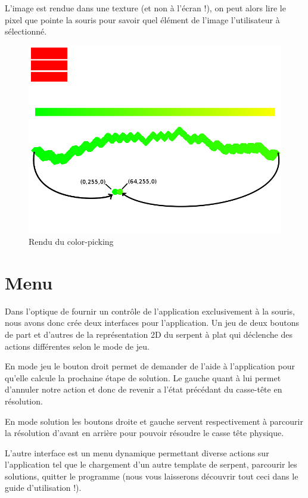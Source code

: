 L'image est rendue dans une texture (et non à l'écran !), on peut alors lire le pixel que pointe la souris pour savoir quel élément de l'image l'utilisateur à sélectionné.

\begin{figure}[h]
 \centering
 \includegraphics[scale=0.3,keepaspectratio=true]{img/colorpick.png}
 \caption{Rendu du color-picking}
 \label{colorPick}
\end{figure}

\section{Menu}
Dans l'optique de fournir un contrôle de l'application exclusivement à la souris, nous avons donc crée deux interfaces pour l'application.
Un jeu de deux boutons de part et d'autres de la représentation 2D du serpent à plat qui déclenche des actions différentes selon le mode de jeu.\newline

En mode jeu le bouton droit permet de demander de l'aide à l'application pour qu'elle calcule la prochaine étape de solution. Le gauche quant à lui permet d'annuler notre action et donc de revenir a l'état précédant du casse-tête en résolution.\newline

En mode solution les boutons droite et gauche servent respectivement à parcourir la résolution d'avant en arrière pour pouvoir résoudre le casse tête physique.\newline

L'autre interface est un menu dynamique permettant diverse actions sur l'application tel que le chargement d'un autre template de serpent, parcourir les solutions, quitter le programme (nous vous laisserons découvrir tout ceci dans le guide d'utilisation !).
